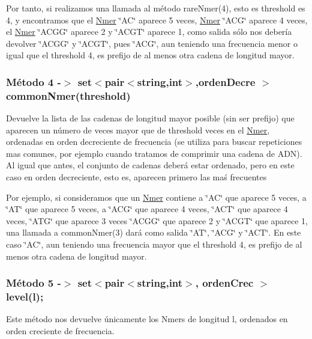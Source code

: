 Por tanto, si realizamos una llamada al método rare\+Nmer(4), esto es threshold es 4, y encontramos que el \hyperlink{classNmer}{Nmer} \char`\"{}\+A\+C\char`\"{} aparece 5 veces, \hyperlink{classNmer}{Nmer} \char`\"{}\+A\+C\+G\char`\"{} aparece 4 veces, el \hyperlink{classNmer}{Nmer} \char`\"{}\+A\+C\+G\+G\char`\"{} aparece 2 y \char`\"{}\+A\+C\+G\+T\char`\"{} aparece 1, como salida sólo nos debería devolver \char`\"{}\+A\+C\+G\+G\char`\"{} y \char`\"{}\+A\+C\+G\+T\char`\"{}, pues \char`\"{}\+A\+C\+G\char`\"{}, aun teniendo una frecuencia menor o igual que el threshold 4, es prefijo de al menos otra cadena de longitud mayor.\hypertarget{index_common}{}\subsubsection{Método 4 -\/$>$  set$<$pair$<$string,int$>$,orden\+Decre $>$ common\+Nmer(threshold)}\label{index_common}
Devuelve la lista de las cadenas de longitud mayor posible (sin ser prefijo) que aparecen un número de veces mayor que de threshold veces en el \hyperlink{classNmer}{Nmer}, ordenadas en orden decreciente de frecuencia (se utiliza para buscar repeticiones mas comunes, por ejemplo cuando tratamos de comprimir una cadena de A\+DN). Al igual que antes, el conjunto de cadenas deberá estar ordenado, pero en este caso en orden decreciente, esto es, aparecen primero las maś frecuentes

Por ejemplo, si consideramos que un \hyperlink{classNmer}{Nmer} contiene a \char`\"{}\+A\+C\char`\"{} que aparece 5 veces, a \char`\"{}\+A\+T\char`\"{} que aparece 5 veces, a \char`\"{}\+A\+C\+G\char`\"{} que aparece 4 veces, \char`\"{}\+A\+C\+T\char`\"{} que aparece 4 veces, \char`\"{}\+A\+T\+G\char`\"{} que aparece 3 veces \char`\"{}\+A\+C\+G\+G\char`\"{} que aparece 2 y \char`\"{}\+A\+C\+G\+T\char`\"{} que aparece 1, una llamada a {\ttfamily common\+Nmer(3)} dará como salida \char`\"{}\+A\+T\char`\"{}, \char`\"{}\+A\+C\+G\char`\"{} y \char`\"{}\+A\+C\+T\char`\"{}. En este caso \char`\"{}\+A\+C\char`\"{}, aun teniendo una frecuencia mayor que el threshold 4, es prefijo de al menos otra cadena de longitud mayor.\hypertarget{index_level}{}\subsubsection{Método 5 -\/$>$ set$<$pair$<$string,int$>$, orden\+Crec $>$ level(l);}\label{index_level}
Este método nos devuelve únicamente los Nmers de longitud l, ordenados en orden creciente de frecuencia.

